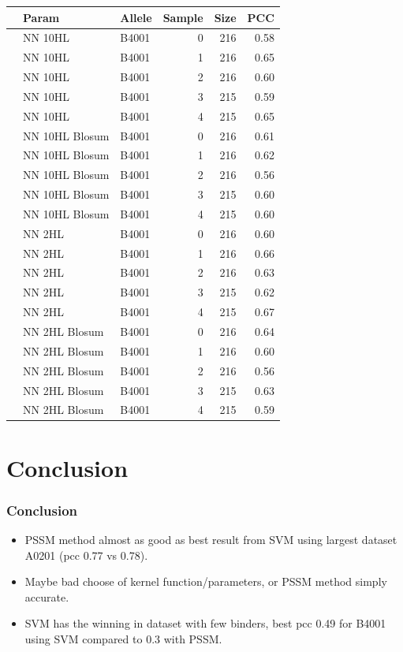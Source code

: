 \documentclass[presentation]{beamer}   %
\begin{document}
\begin{frame}
\begin{table}[hb]\scriptsize
\begin{center}
\begin{tabular}{rllrrr}
  \hline
 & Param & Allele & Sample & Size & PCC \\ 
  \hline
   & NN 10HL & B4001 &   0 & 216 & 0.58 \\ 
   & NN 10HL & B4001 &   1 & 216 & 0.65 \\ 
   & NN 10HL & B4001 &   2 & 216 & 0.60 \\ 
   & NN 10HL & B4001 &   3 & 215 & 0.59 \\ 
   & NN 10HL & B4001 &   4 & 215 & 0.65 \\ 
\hline
   & NN 10HL Blosum & B4001 &   0 & 216 & 0.61 \\ 
   & NN 10HL Blosum & B4001 &   1 & 216 & 0.62 \\ 
   & NN 10HL Blosum & B4001 &   2 & 216 & 0.56 \\ 
   & NN 10HL Blosum & B4001 &   3 & 215 & 0.60 \\ 
   & NN 10HL Blosum & B4001 &   4 & 215 & 0.60 \\ 
\hline
   & NN 2HL & B4001 &   0 & 216 & 0.60 \\ 
   & NN 2HL & B4001 &   1 & 216 & 0.66 \\ 
   & NN 2HL & B4001 &   2 & 216 & 0.63 \\ 
   & NN 2HL & B4001 &   3 & 215 & 0.62 \\ 
   & NN 2HL & B4001 &   4 & 215 & 0.67 \\ 
\hline
   & NN 2HL Blosum & B4001 &   0 & 216 & 0.64 \\ 
   & NN 2HL Blosum & B4001 &   1 & 216 & 0.60 \\ 
   & NN 2HL Blosum & B4001 &   2 & 216 & 0.56 \\ 
   & NN 2HL Blosum & B4001 &   3 & 215 & 0.63 \\ 
   & NN 2HL Blosum & B4001 &   4 & 215 & 0.59 \\ 
   \hline
\end{tabular}
\end{center}
\end{table}
\end{frame}



\section{Conclusion}
\begin{frame}
\frametitle{Conclusion}
\begin{itemize}
\item PSSM method almost as good as best result from SVM using largest dataset A0201 (pcc 0.77 vs 0.78). \pause
\item Maybe bad choose of kernel function/parameters, or PSSM method simply accurate. \pause
\item SVM has the winning in dataset with few binders, best pcc 0.49 for B4001 using SVM compared to 0.3 with PSSM.
\end{itemize}
\end{frame}
\end{document}
